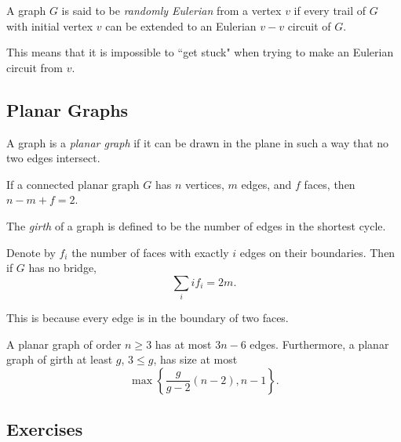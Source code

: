 \begin{definition}
A graph $G$ is said to be \textit{randomly Eulerian} from a vertex $v$ if every trail of $G$ with initial vertex $v$ can be extended to an Eulerian $v-v$ circuit of $G$.
\end{definition}

This means that it is impossible to ``get stuck" when trying to make an Eulerian circuit from $v$.

\subsection{Planar Graphs}

\begin{definition}
A graph is a \textit{planar graph} if it can be drawn in the plane in such a way that no two edges intersect.
\end{definition}

\begin{theorem}
If a connected planar graph $G$ has $n$ vertices, $m$ edges, and $f$ faces, then $n-m+f=2$.
\end{theorem}

\begin{definition}
The \textit{girth} of a graph is defined to be the number of edges in the shortest cycle.
\end{definition}

\begin{theorem}
Denote by $f_i$ the number of faces with exactly $i$ edges on their boundaries. Then if $G$ has no bridge,
$$\sum_i if_i = 2m.$$
\end{theorem}

This is because every edge is in the boundary of two faces.

\begin{ftheo}
A planar graph of order $n\geq 3$ has at most $3n-6$ edges.  Furthermore, a planar graph of girth at least $g$, $3\leq g$, has size at most
$$\max\left\{\frac{g}{g-2}(n-2), n-1\right\}.$$
\end{ftheo}

\subsection{Exercises}

